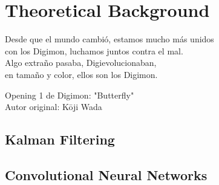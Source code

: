 % 
% 
% 
% 
% 
% 
% 

\chapter{Theoretical Background}
\label{cha:theoretical_background}

\begin{FraseCelebre}
	\begin{Frase}
		Desde que el mundo cambió, estamos mucho más unidos \\
		con los Digimon, luchamos juntos contra el mal. \\ 

		Algo extraño pasaba, Digievolucionaban, \\
		en tamaño y color, ellos son los Digimon. \\
	\end{Frase}
	\begin{Fuente}
		Opening 1 de Digimon: "Butterfly" \\
		Autor original: Kōji Wada
	\end{Fuente}
\end{FraseCelebre}

\section{Kalman Filtering}
\label{sec:3_kf}

\section{Convolutional Neural Networks}
\label{sec:3_cnns}

